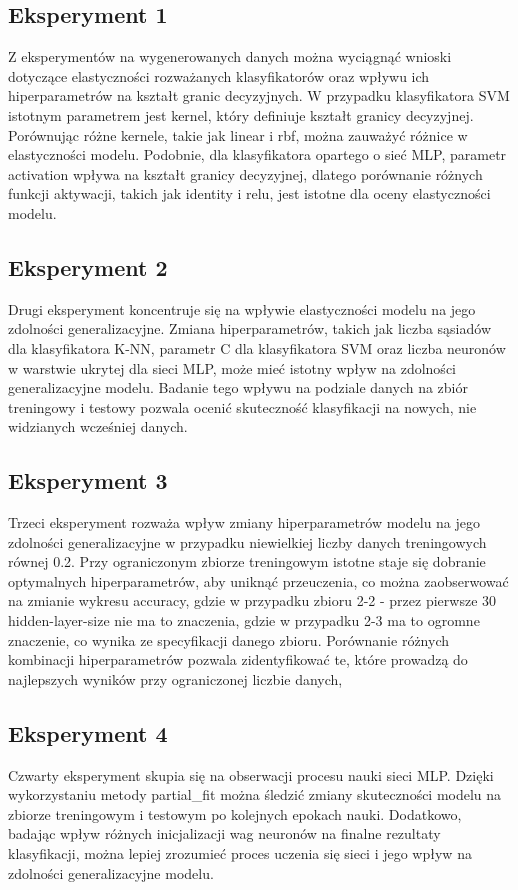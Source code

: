 \documentclass[12pt]{article}
\begin{document}
\subsection*{Eksperyment 1}
Z eksperymentów na wygenerowanych danych można wyciągnąć wnioski dotyczące elastyczności rozważanych klasyfikatorów oraz wpływu ich hiperparametrów na kształt granic decyzyjnych. W przypadku klasyfikatora SVM istotnym parametrem jest kernel, który definiuje kształt granicy decyzyjnej. Porównując różne kernele, takie jak linear i rbf, można zauważyć różnice w elastyczności modelu. Podobnie, dla klasyfikatora opartego o sieć MLP, parametr activation wpływa na kształt granicy decyzyjnej, dlatego porównanie różnych funkcji aktywacji, takich jak identity i relu, jest istotne dla oceny elastyczności modelu.
\subsection*{Eksperyment 2}
Drugi eksperyment koncentruje się na wpływie elastyczności modelu na jego zdolności generalizacyjne. Zmiana hiperparametrów, takich jak liczba sąsiadów dla klasyfikatora K-NN, parametr C dla klasyfikatora SVM oraz liczba neuronów w warstwie ukrytej dla sieci MLP, może mieć istotny wpływ na zdolności generalizacyjne modelu. Badanie tego wpływu na podziale danych na zbiór treningowy i testowy pozwala ocenić skuteczność klasyfikacji na nowych, nie widzianych wcześniej danych.
\subsection*{Eksperyment 3}
Trzeci eksperyment rozważa wpływ zmiany hiperparametrów modelu na jego zdolności 
generalizacyjne w przypadku niewielkiej liczby danych treningowych równej 0.2.
Przy ograniczonym zbiorze treningowym istotne staje się dobranie optymalnych hiperparametrów, 
aby uniknąć przeuczenia, co można zaobserwować na zmianie wykresu accuracy, gdzie w przypadku zbioru 2-2 - przez pierwsze 30 hidden-layer-size nie ma to znaczenia, gdzie w przypadku 2-3 ma to ogromne znaczenie, co wynika ze specyfikacji danego zbioru.
Porównanie różnych kombinacji hiperparametrów pozwala zidentyfikować te, które prowadzą do najlepszych wyników 
przy ograniczonej liczbie danych, 
\subsection*{Eksperyment 4}
Czwarty eksperyment skupia się na obserwacji procesu nauki sieci MLP. Dzięki wykorzystaniu metody partial_fit można śledzić zmiany skuteczności modelu na zbiorze treningowym i testowym po kolejnych epokach nauki. Dodatkowo, badając wpływ różnych inicjalizacji wag neuronów na finalne rezultaty klasyfikacji, można lepiej zrozumieć proces uczenia się sieci i jego wpływ na zdolności generalizacyjne modelu.
\clearpage
\end{document}
